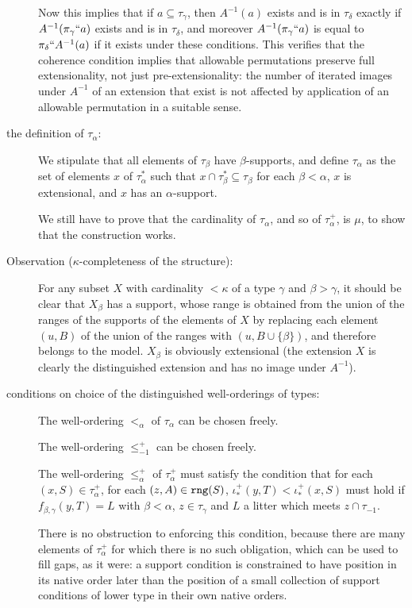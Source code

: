 \documentclass[112pt]{article}
\begin{document}
\begin{description}
Now this implies that if $a \subseteq \tau_\gamma$, then $A^{-1}(a)$ exists and is in $\tau_\delta$ exactly if $A^{-1}(\pi_\gamma``a)$ exists and is in $\tau_\delta$, and moreover $A^{-1}(\pi_\gamma``a)$ is equal to $\pi_\delta``A^{-1}(a)$ if it exists under these conditions.  This verifies that the coherence condition implies that allowable permutations preserve full extensionality, not just pre-extensionality:  the number of iterated images under $A^{-1}$ of an extension that exist is not affected by application of an allowable permutation in a suitable sense.



\item[the definition of $\tau_\alpha$:]  We stipulate that all elements of $\tau_\beta$ have $\beta$-supports, and define $\tau_\alpha$ as the set of elements $x$ of $\tau^*_\alpha$ such that
$x \cap \tau^*_{\beta} \subseteq \tau_\beta$ for each $\beta<\alpha$, $x$ is extensional, and $x$ has an $\alpha$-support.

We still have to prove that the cardinality of $\tau_\alpha$, and so of $\tau^+_\alpha$, is $\mu$, to show that the construction works.

\item[Observation ($\kappa$-completeness of the structure):]  For any subset $X$ with cardinality $<\kappa$ of a type $\gamma$ and $\beta>\gamma$, it should be clear that $X_\beta$ has a support, whose range is obtained from the union of the ranges of the supports of the elements of $X$  by replacing each element $(u,B)$ of the union of the ranges  with $(u,B \cup \{\beta\})$, and therefore belongs to the model.  $X_\beta$ is obviously extensional (the extension $X$ is clearly the distinguished extension and has no image under $A^{-1}$).

\item[conditions on choice of the distinguished well-orderings of types:]   The well-ordering $<_\alpha$ of $\tau_\alpha$ can be chosen freely.

The well-ordering $\leq_{-1}^+$ can be chosen freely.

The well-ordering $\leq_\alpha^+$ of $\tau_\alpha^+$ must satisfy the condition that for each $(x,S) \in \tau_\alpha^+$, for each $(z,A) \in {\tt rng}(S)$, $\iota_*^+(y,T) < \iota_*^+(x,S)$ must hold if $f_{\beta,\gamma}(y,T) = L$  with $\beta<\alpha$, $z \in \tau_\gamma$ and
$L$ a litter which meets $z \cap \tau_{-1}$. 

There is no obstruction to enforcing this condition, because there are many elements of $\tau_{\alpha}^+$ for which there is no such obligation, which can be used to fill gaps, as it were: a support condition is constrained to have position in its native order later than the position of a small collection of support conditions of lower type in their own native orders.


\end{description}
\end{document}
